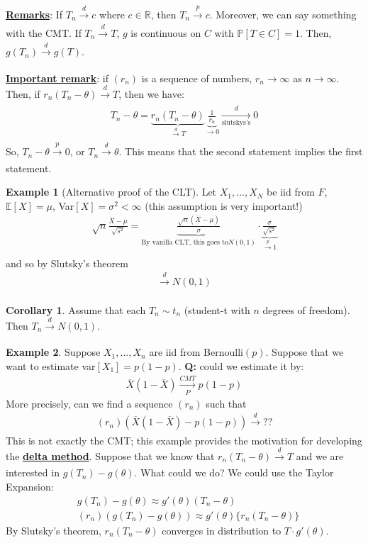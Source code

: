 \documentclass[11pt]{scrartcl}
\newcommand{\R}[0]{\mathbb{R}}
\theoremstyle{definition}
\newtheorem{corollary}{Corollary}
\newtheorem{ex}{Example}
\theoremstyle{remark}
\newcommand{\dfn}[1]{\textbf{\underline{#1}}}
\newcommand{\pr}[1]{\mathbb{P}\left[#1 \right]}
\newcommand{\EX}[1]{\mathbb{E}\left[#1 \right]}
\begin{document}
{\dfn{Remarks}: If $T_n \xrightarrow[]{d} c$ where $c \in \R$, then $T_n \xrightarrow[]{p} c$. Moreover, we can say something with the CMT. If $T_n \xrightarrow[]{d} T$, $g$ is continuous on $C$ with $\pr{T \in C} = 1$. Then, $g(T_n) \xrightarrow[]{d} g(T)$. 

\dfn{Important remark}: if $(r_n)$ is a sequence of numbers, $r_n \rightarrow \infty$ as $n \rightarrow \infty$. Then, if $r_n (T_n - \theta) \xrightarrow[]{d} T$, then we have: 
\begin{align*} 
	T_n - \theta = \underbrace{r_n(T_n - \theta)}_{\xrightarrow[]{d} T} \underbrace{ \frac{1}{r_n}	}_{\rightarrow 0} \xrightarrow[\text{slutskys's}]{d} 0 
\end{align*}
So, $T_n - \theta \xrightarrow[]{p} 0$, or $T_n \xrightarrow[]{d} \theta$. This means that the second statement implies the first statement. 

\begin{ex}[Alternative proof of the CLT] 
		Let $X_1,..., X_N$ be iid from $F$, $\EX{X} = \mu$, Var$[X] = \sigma^2 < \infty$ (this assumption is very important!) 
		\begin{align}
			\sqrt{n} \frac{\overline{X} - \mu}{\sqrt{s^2}} = \underbrace{\frac{\sqrt{n} (\overline{X} - \mu)}{\sigma}}_{\text{By vanilla CLT, this goes to} N(0,1)} \cdot \underbrace{\frac{\sigma}{\sqrt{s^2}}}_{\xrightarrow[]{p} 1}
		\end{align}
		and so by Slutsky's theorem 
		\begin{align*} 
			\xrightarrow[]{d} N(0,1) 	
		\end{align*}
\end{ex}

\begin{corollary} Assume that each $T_n \sim t_n$ (student-t with $n$ degrees of freedom). Then $T_n \xrightarrow[]{d} N(0,1)$. 
	
\end{corollary}

\begin{ex}
	Suppose $X_1, ..., X_n$ are iid from Bernoulli$(p)$. Suppose that we want to estimate var$[X_1] = p(1-p)$. \textbf{Q:} could we estimate it by: 
	\begin{align*}
		\overline{X}(1- \overline{X} ) \xrightarrow[P]{CMT} p(1-p)	
	\end{align*}
	More precisely, can we find a sequence $(r_n)$ such that
	\begin{align*}
		(r_n) (\overline{X}(1-\overline{X}) - p(1-p) ) \xrightarrow[]{d} ?? 	
	\end{align*}
	This is not exactly the CMT; this example provides the motivation for developing the \dfn{delta method}. Suppose that we know that $r_n(T_n - \theta) \xrightarrow[]{d} T$ and we are interested in $g(T_n) - g(\theta)$. What could we do? We could use the Taylor Expansion: 
	\begin{align*}
		& g(T_n) - g(\theta) \approx g'(\theta) (T_n - \theta) 	\\
		& (r_n) (g (T_n) - g(\theta) ) \approx g'(\theta) \{ r_n (T_n - \theta) \} 
	\end{align*}
	By Slutsky's theorem, $r_n(T_n - \theta)$ converges in distribution to $T \cdot g'(\theta)$. 
\end{ex}

}
\end{document}

